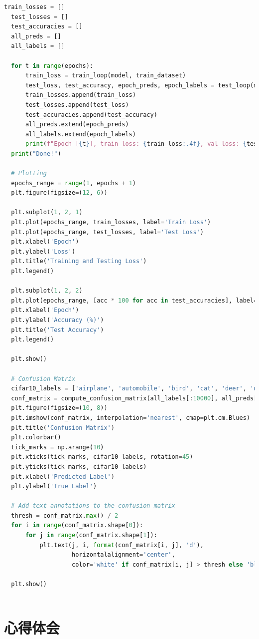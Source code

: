 \documentclass[12pt]{article}
\begin{document}
\begin{lstlisting}[language=Python]
  train_losses = []
  test_losses = []
  test_accuracies = []
  all_preds = []
  all_labels = []
  
  for t in range(epochs):
      train_loss = train_loop(model, train_dataset)
      test_loss, test_accuracy, epoch_preds, epoch_labels = test_loop(model, test_dataset, loss_fn)
      train_losses.append(train_loss)
      test_losses.append(test_loss)
      test_accuracies.append(test_accuracy)
      all_preds.extend(epoch_preds)
      all_labels.extend(epoch_labels)
      print(f"Epoch [{t}], train_loss: {train_loss:.4f}, val_loss: {test_loss:.4f}, val_acc: {test_accuracy:.4f}")
  print("Done!")
  
  # Plotting
  epochs_range = range(1, epochs + 1)
  plt.figure(figsize=(12, 6))
  
  plt.subplot(1, 2, 1)
  plt.plot(epochs_range, train_losses, label='Train Loss')
  plt.plot(epochs_range, test_losses, label='Test Loss')
  plt.xlabel('Epoch')
  plt.ylabel('Loss')
  plt.title('Training and Testing Loss')
  plt.legend()
  
  plt.subplot(1, 2, 2)
  plt.plot(epochs_range, [acc * 100 for acc in test_accuracies], label='Test Accuracy')
  plt.xlabel('Epoch')
  plt.ylabel('Accuracy (%)')
  plt.title('Test Accuracy')
  plt.legend()
  
  plt.show()
  
  # Confusion Matrix
  cifar10_labels = ['airplane', 'automobile', 'bird', 'cat', 'deer', 'dog', 'frog', 'horse', 'ship', 'truck']
  conf_matrix = compute_confusion_matrix(all_labels[:10000], all_preds[:10000], 10)
  plt.figure(figsize=(10, 8))
  plt.imshow(conf_matrix, interpolation='nearest', cmap=plt.cm.Blues)
  plt.title('Confusion Matrix')
  plt.colorbar()
  tick_marks = np.arange(10)
  plt.xticks(tick_marks, cifar10_labels, rotation=45)
  plt.yticks(tick_marks, cifar10_labels)
  plt.xlabel('Predicted Label')
  plt.ylabel('True Label')
  
  # Add text annotations to the confusion matrix
  thresh = conf_matrix.max() / 2
  for i in range(conf_matrix.shape[0]):
      for j in range(conf_matrix.shape[1]):
          plt.text(j, i, format(conf_matrix[i, j], 'd'),
                   horizontalalignment='center',
                   color='white' if conf_matrix[i, j] > thresh else 'black')
  
  plt.show()
  
\end{lstlisting}

\newpage
\section{\centering 心得体会}
\end{document}
